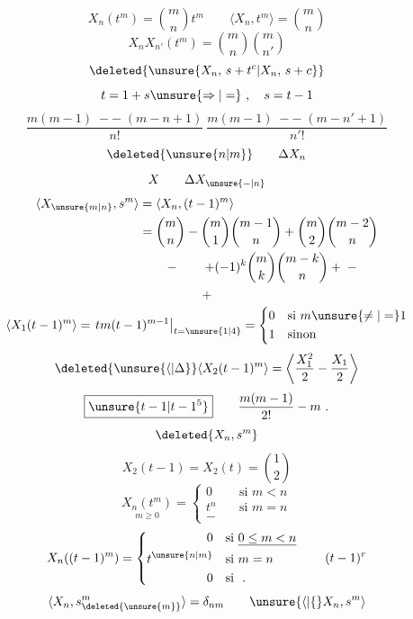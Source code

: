 \[
X_n(t^m)=\binom mn t^m\qquad\langle X_n,t^m\rangle=\binom mn
\]
\[X_nX_{n'}(t^m)=\binom mn\binom m{n'}\]
\[\deleted{\unsure{X_n,\,s+t^c|X_n,\,s+c}}\]
\[t=1+s\unsure{\Rightarrow|=}\ ,\quad s=t-1\]
\[
\frac{m(m-1)\;--\;(m-n+1)}{n!}\ \frac{m(m-1)\;--\;(m-n'+1)}{n'!}
\]
\[\deleted{\unsure{n|m}}\qquad\Delta X_n\]
\[{\Large X}\qquad\Delta X_{\unsure{-|n}}\]
\[
\begin{aligned}
\langle X_{\unsure{m|n}},s^m\rangle&=\langle X_n,(t-1)^m\rangle\\
&=\binom mn-\binom m1\binom{m-1}n+\binom m2\binom{m-2}n\\
&\qquad-\qquad+(-1)^k\binom mk\binom{m-k}n+\;-
\end{aligned}
\]
\[+\]
\[
\langle X_1(t-1)^m\rangle=\left.tm(t-1)^{m-1}\right|_{t=\unsure{1|4}}
=\left\{\begin{aligned}
0&\quad\text{si }m\unsure{\ne|=}1\\
1&\quad\text{sinon}
\end{aligned}\right.
\]
\[
\deleted{\unsure{\langle|\Delta}}\langle X_2(t-1)^m\rangle=\left\langle\frac{X_1^2}{2}-\frac{X_1}{2}\right\rangle
\]
\[\boxed{\unsure{t-1|t-1^5}}\qquad\frac{m(m-1)}{2!}-m\ .\]
\[\deleted{X_n,s^m}\]
\[X_2(t-1)=X_2(t)=\binom12\]
\[
\underset{m\geq0}{X_n(t^m)}=\left\{\begin{aligned}
0&\quad\text{si }m<n\\
t^n&\quad\text{si }m=n\\
-&
\end{aligned}\right.
\]
\[
X_n((t-1)^m)=\left\{\begin{aligned}
0&\quad\text{si }\underline{0\leq m<n}\\
t^{\unsure{n|m}}&\quad\text{si }m=n\\
0&\quad\text{si }\ .
\end{aligned}\right.
\qquad(t-1)^r
\]
\[\langle X_n,s_{\deleted{\unsure{m}}}^{m}\rangle=\delta_{nm}\qquad\unsure{\langle|\{}X_n,s^m\rangle\]
